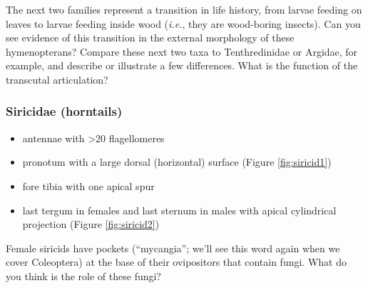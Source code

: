 \documentclass[letterpaper, 11pt]{article}
\begin{document}
\noindent{}The next two families represent a transition in life history, from larvae feeding on leaves to larvae feeding inside wood (\textit{i.e.}, they are wood-boring insects). Can you see evidence of this transition in the external morphology of these hymenopterans? Compare these next two taxa to Tenthredinidae or Argidae, for example, and describe or illustrate a few differences. What is the function of the transcutal articulation?

\subsubsection{Siricidae (horntails)}
\begin{itemize}
\item antennae with \textgreater{}20 flagellomeres
\item pronotum with a large dorsal (horizontal) surface (Figure \ref{fig:siricid1})
\item fore tibia with one apical spur
\item last tergum in females and last sternum in males with apical cylindrical projection (Figure \ref{fig:siricid2})
\end{itemize}
\noindent{}Female siricids have pockets (``mycangia''; we'll see this word again when we cover Coleoptera) at the base of their ovipositors that contain fungi. What do you think is the role of these fungi?
\end{document}

